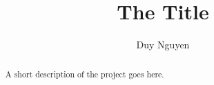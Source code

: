 \documentclass[11pt
              , a4paper
              , twoside
              , openright
              ]{report}
\title{The Title}
\author{Duy Nguyen}
\date{}
\begin{document}
\frontmatter



\begin{abstract}

A short description of the project goes here.

\end{abstract}


\maketitle



\tableofcontents



\mainmatter









\backmatter



%


\end{document}
